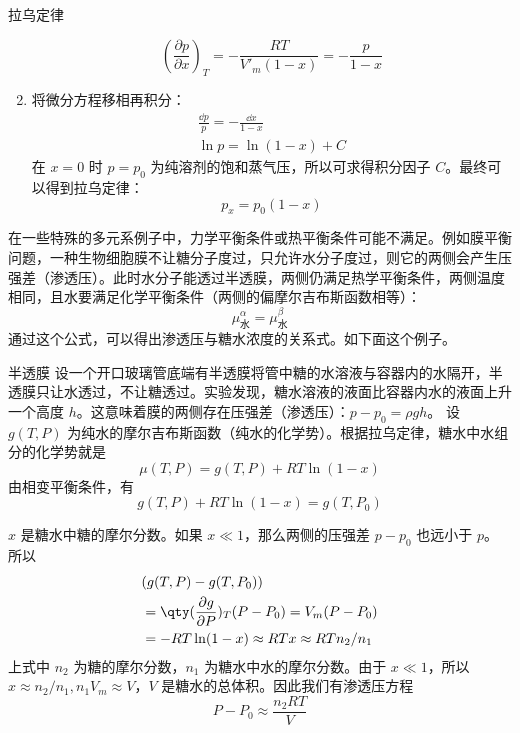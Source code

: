 \begin{example}{拉乌定律}
\begin{enumerate}
\begin{equation}
\left(\frac{\partial p}{\partial x}\right)_T=-\frac{RT}{V'_m(1-x)}=-\frac{p}{1-x}
\end{equation}
\item 将微分方程移相再积分：
\begin{equation}
\begin{aligned}
\frac{\dd p}{p}=-\frac{\dd x}{1-x}\\
\ln p=\ln(1-x)+C
\end{aligned}
\end{equation}
在 $x=0$ 时 $p=p_0$ 为纯溶剂的饱和蒸气压，所以可求得积分因子 $C$。最终可以得到拉乌定律：
\begin{equation}
p_x=p_0(1-x)
\end{equation}
\end{enumerate}
\end{example}

在一些特殊的多元系例子中，力学平衡条件或热平衡条件可能不满足。例如膜平衡问题，一种生物细胞膜不让糖分子度过，只允许水分子度过，则它的两侧会产生压强差（渗透压）。此时水分子能透过半透膜，两侧仍满足热学平衡条件，两侧温度相同，且水要满足化学平衡条件（两侧的偏摩尔吉布斯函数相等）：
\begin{equation}
\mu_\text{水}^\alpha=\mu_\text{水}^\beta
\end{equation}
通过这个公式，可以得出渗透压与糖水浓度的关系式。如下面这个例子。
\begin{example}{半透膜}
设一个开口玻璃管底端有半透膜将管中糖的水溶液与容器内的水隔开，半透膜只让水透过，不让糖透过。实验发现，糖水溶液的液面比容器内水的液面上升一个高度 $h$。这意味着膜的两侧存在压强差（渗透压）：$p-p_0=\rho gh$。
设 $g(T,P)$ 为纯水的摩尔吉布斯函数（纯水的化学势）。根据拉乌定律，糖水中水组分的化学势就是
\begin{equation}
\mu(T,P)=g(T,P)+RT\ln (1-x)
\end{equation}
由相变平衡条件，有
\begin{equation}
g(T,P)+RT\ln (1-x)=g(T,P_0)
\end{equation}

$x$ 是糖水中糖的摩尔分数。如果 $x\ll 1$，那么两侧的压强差 $p-p_0$ 也远小于 $p$。所以
\begin{equation}
\begin{aligned}
&(g(T,P)-g(T,P_0))\\
&=\qty(\frac{\partial g}{\partial P})_{T} (P-P_0)=V_m(P-P_0)\\
&=-RT\ln(1-x)\approx RT x\approx RT n_2/n_1
\end{aligned}
\end{equation}
上式中 $n_2$ 为糖的摩尔分数，$n_1$ 为糖水中水的摩尔分数。由于 $x\ll 1$，所以 $x\approx n_2/n_1, n_1V_m\approx V$，$V$ 是糖水的总体积。因此我们有渗透压方程
\begin{equation}
P-P_0\approx\frac{n_2RT}{V}
\end{equation}


\end{example}

